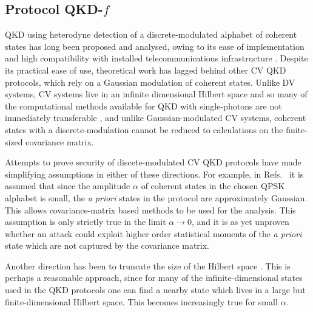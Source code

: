 \subsection{Protocol QKD-$f$}
QKD using heterodyne detection of a discrete-modulated alphabet of coherent states has long been proposed and analysed, owing to its ease of implementation and high compatibility with installed telecommunications infrastructure \cite{Leverrier2011, Papanastasiou2018, Zhao2009, Bradler2018, Ghorai2019, Lin2019}. Despite its practical ease of use, theoretical work has lagged behind other CV QKD protocols, which rely on a Gaussian modulation of coherent states. Unlike DV systems, CV systems live in an infinite dimensional Hilbert space and so many of the computational methods available for QKD with single-photons are not immediately transferable \cite{Tomamichel2012a}, and unlike Gaussian-modulated CV systems, coherent states with a discrete-modulation cannot be reduced to calculations on the finite-sized covariance matrix.  

Attempts to prove security of discete-modulated CV QKD protocols have made simplifying assumptions in either of these directions. For example, in Refs.~\cite{Leverrier2011, Ghorai2019} it is assumed that since the amplitude $\alpha$ of coherent states in the chosen QPSK alphabet is small, the \emph{a priori} states in the protocol are approximately Gaussian. This allows covariance-matrix based methods to be used for the analysis. This assumption is only strictly true in the limit $\alpha \rightarrow 0$, and it is as yet unproven whether an attack could exploit higher order statistical moments of the \emph{a priori} state which are not captured by the covariance matrix.


Another direction has been to truncate the size of the Hilbert space \cite{Ghorai2019, Lin2019, Papanastasiou2018}. This is perhaps a reasonable approach, since for many of the infinite-dimensional states used in the QKD protocols one can find a nearby state which lives in a large but finite-dimensional Hilbert space. This becomes increasingly true for small $\alpha$. 

